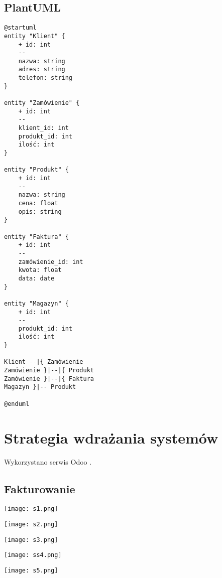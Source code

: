 \subsection*{PlantUML}

\begin{verbatim}
@startuml
entity "Klient" {
    + id: int
    --
    nazwa: string
    adres: string
    telefon: string
}

entity "Zamówienie" {
    + id: int
    --
    klient_id: int
    produkt_id: int
    ilość: int
}

entity "Produkt" {
    + id: int
    --
    nazwa: string
    cena: float
    opis: string
}

entity "Faktura" {
    + id: int
    --
    zamówienie_id: int
    kwota: float
    data: date
}

entity "Magazyn" {
    + id: int
    --
    produkt_id: int
    ilość: int
}

Klient --|{ Zamówienie
Zamówienie }|--|{ Produkt
Zamówienie }|--|{ Faktura
Magazyn }|-- Produkt

@enduml

\end{verbatim}


\section{Strategia wdrażania systemów}

Wykorzystano serwis Odoo \cite{odoo}.

\subsection*{Fakturowanie}
\begin{center}
    \texttt{[image: s1.png]}\\[0.5cm]
\end{center}
\begin{center}
    \texttt{[image: s2.png]}\\[0.5cm]
\end{center}
\begin{center}
    \texttt{[image: s3.png]}\\[0.5cm]
\end{center}
\begin{center}
    \texttt{[image: ss4.png]}\\[0.5cm]
\end{center}
\begin{center}
    \texttt{[image: s5.png]}\\[0.5cm]
\end{center}



